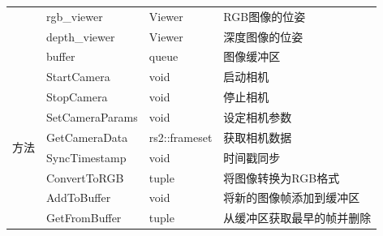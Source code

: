 \begin{table}[htb]
\begin{tabular}{|l|m{3.5cm}|m{3.5cm}|m{5cm}|}
		\multicolumn{1}{|c|}{}                     & \centering\arraybackslash rgb\_viewer           & \centering\arraybackslash Viewer              & \centering\arraybackslash RGB图像的位姿      \\ \cline{2-4}
		\multicolumn{1}{|c|}{}                     & \centering\arraybackslash depth\_viewer         & \centering\arraybackslash Viewer              & \centering\arraybackslash 深度图像的位姿       \\ \cline{2-4}
		\multicolumn{1}{|c|}{}                     & \centering\arraybackslash buffer                & \centering\arraybackslash queue          & \centering\arraybackslash 图像缓冲区         \\ \hline
		\multirow{14}{*}{方法}                       & \centering\arraybackslash StartCamera           & \centering\arraybackslash void                & \centering\arraybackslash 启动相机          \\ \cline{2-4}
		                                           & \centering\arraybackslash StopCamera            & \centering\arraybackslash void                & \centering\arraybackslash 停止相机          \\ \cline{2-4}
		                                           & \centering\arraybackslash SetCameraParams       & \centering\arraybackslash void                & \centering\arraybackslash 设定相机参数        \\ \cline{2-4}
		                                           & \centering\arraybackslash GetCameraData         & \centering\arraybackslash rs2::frameset       & \centering\arraybackslash 获取相机数据        \\ \cline{2-4}
		                                           & \centering\arraybackslash SyncTimestamp         & \centering\arraybackslash void                & \centering\arraybackslash 时间戳同步         \\ \cline{2-4}
		                                           & \centering\arraybackslash ConvertToRGB          & \centering\arraybackslash tuple          & \centering\arraybackslash 将图像转换为RGB格式   \\ \cline{2-4}
		                                           & \centering\arraybackslash AddToBuffer           & \centering\arraybackslash void                & \centering\arraybackslash 将新的图像帧添加到缓冲区  \\ \cline{2-4}
		                                           & \centering\arraybackslash GetFromBuffer         & \centering\arraybackslash tuple          & \centering\arraybackslash 从缓冲区获取最早的帧并删除 \\ \cline{2-4}

\end{tabular}
\end{table}
